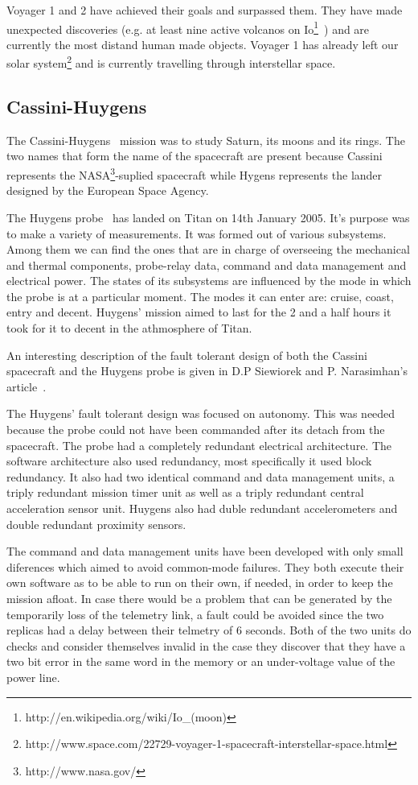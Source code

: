 Voyager 1 and 2 have achieved their goals and surpassed them. They have made
unexpected discoveries (e.g. at least nine active volcanos on
Io\footnote{http://en.wikipedia.org/wiki/Io\_(moon)}~\cite{tvs}) and are
currently the most distand human made objects. Voyager 1 has already left our
solar
system\footnote{http://www.space.com/22729-voyager-1-spacecraft-interstellar-space.html}
and is currently travelling through interstellar space.

\subsection{Cassini-Huygens}

The Cassini-Huygens~\cite{ch-nasa} mission was to study Saturn, its moons and
its rings. The two names that form the name of the spacecraft are present because
Cassini represents the NASA\footnote{http://www.nasa.gov/}-suplied spacecraft
while Hygens represents the lander designed by the European Space Agency.

The Huygens probe~\cite{hygens} has landed on Titan on 14th January 2005. It's
purpose was to make a variety of measurements. It was formed out of various
subsystems. Among them we can find the ones that are in charge of overseeing the
mechanical and thermal components, probe-relay data, command and data management
and electrical power. The states of its subsystems are influenced by the mode in
which the probe is at a particular moment. The modes it can enter are: cruise,
coast, entry and decent. Huygens' mission aimed to last for the 2 and a half
hours it took for it to decent in the athmosphere of Titan.

An interesting description of the fault tolerant design of both the Cassini
spacecraft and the Huygens probe is given in D.P Siewiorek and P.
Narasimhan's article~\cite{ft-space-avionics}. 

The Huygens' fault tolerant design was focused on autonomy. This was needed
because the probe could not have been commanded after its detach from the
spacecraft. The probe had a completely redundant electrical architecture. The
software architecture also used redundancy, most specifically it used block
redundancy. It also had two identical command and data management units, a
triply redundant mission timer unit as well as a triply redundant central
acceleration sensor unit. Huygens also had duble redundant accelerometers and
double redundant proximity sensors.

The command and data management units have been developed with only small
diferences which aimed to avoid common-mode failures. They both execute their
own software as to be able to run on their own, if needed, in order to keep the
mission afloat. In case there would be a problem that can be generated by the
temporarily loss of the telemetry link, a fault could be avoided since the two
replicas had a delay between their telmetry of 6 seconds. Both of the two units
do checks and consider themselves invalid in the case they discover that they have
a two bit error in the same word in the memory or an under-voltage value of the
power line.

